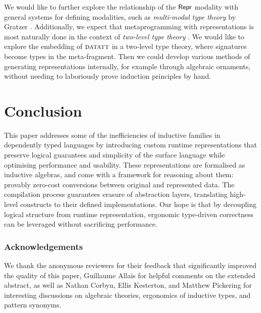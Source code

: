 We would like to further explore the relationship of the $\textsf{Repr}$ modality with
general systems for defining modalities, such as \emph{multi-modal type theory}
by Gratzer \cite{Gratzer2020-kf}. Additionally, we expect that metaprogramming with
representations is most naturally done in the context of \emph{two-level type theory}
\cite{Kovacs2022-vb}. We would like to explore the embedding of ${\textsc{datatt}}$
in a two-level type theory, where signatures become types in the meta-fragment.
Then we could develop various methods of generating representations internally,
for example through algebraic ornaments, without needing to laboriously prove
induction principles by hand.

\section{Conclusion}

This paper addresses some of the inefficiencies of inductive families in
dependently typed languages by introducing custom runtime representations that
preserve logical guarantees and simplicity of the surface language while
optimising performance and usability. These representations are formalised as inductive
algebras, and come with a framework for reasoning about them: provably zero-cost
conversions between original and represented data.
The compilation process guarantees erasure of abstraction layers, translating
high-level constructs to their defined implementations. Our hope is that by
decoupling logical structure from runtime representation, ergonomic type-driven
correctness can be leveraged without sacrificing performance.


\subsubsection{Acknowledgements}
We thank the anonymous reviewers for their feedback that
significantly improved the quality of this paper, Guillaume Allais for helpful
comments on the extended abstract, as well as Nathan Corbyn, Ellis
Kesterton, and Matthew Pickering for interesting discussions on algebraic
theories, ergonomics of inductive types, and pattern synonyms.
